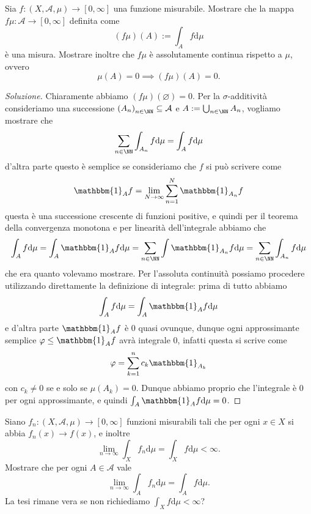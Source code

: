 \documentclass[11pt]{scrartcl}
\newcommand{\dif}{\text{d}}
\newcommand{\eset}{\varnothing}
\begin{document}
	\begin{exercise}
		Sia $f:(X,\mathcal{A},\mu)\to [0,\infty]$ una funzione misurabile. Mostrare che la mappa $f\mu:\mathcal{A}\to [0,\infty]$ definita come
		$$\left(f\mu\right)(A):=\int_A f\dif \mu$$
		è una misura. Mostrare inoltre che $f\mu$ è assolutamente continua rispetto a $\mu$, ovvero 
		$$\mu(A)=0 \implies (f\mu)(A)=0.$$
	\end{exercise}
	\begin{proof}[Soluzione]
		Chiaramente abbiamo $(f\mu)(\eset)=0$. Per la $\sigma$-additività consideriamo una successione $\left(A_n\right)_{n\in\NN}\subseteq \mathcal{A}$ e $A:=\bigcup_{n\in\NN}A_n$, vogliamo mostrare che 
		$$\sum_{n\in\NN}\int_{A_n}f\dif \mu = \int_A f\dif\mu$$
		d'altra parte questo è semplice se consideriamo che $f$ si può scrivere come
		$$\mathbbm{1}_Af=\lim_{N\to\infty}\sum_{n=1}^N\mathbbm{1}_{A_n}f$$
		questa è una successione crescente di funzioni positive, e quindi per il teorema della convergenza monotona e per linearità dell'integrale abbiamo che
		$$\int_Af\dif \mu = \int_A\mathbbm{1}_Af\dif \mu=\sum_{n\in\NN}\int \mathbbm{1}_{A_n}f\dif \mu=\sum_{n\in\NN}\int_{A_n}f\dif\mu$$
		che era quanto volevamo mostrare. Per l'assoluta continuità possiamo procedere utilizzando direttamente la definizione di integrale: prima di tutto abbiamo
		$$\int_Af\dif \mu = \int_A\mathbbm{1}_Af\dif \mu$$
		e d'altra parte $\mathbbm{1}_Af$ è $0$ quasi ovunque, dunque ogni approssimante semplice $\varphi\le \mathbbm{1}_Af$ avrà integrale $0$, infatti questa si scrive come
		$$\varphi=\sum_{k=1}^n c_k\mathbbm{1}_{A_k}$$
		con $c_k\ne 0$ se e solo se $\mu(A_k)=0$. Dunque abbiamo proprio che l'integrale è $0$ per ogni approssimante, e quindi $\int_A\mathbbm{1}_Af\dif \mu=0$.
	\end{proof}
	\begin{exercise}
		Siano $f_n:(X,\mathcal{A},\mu)\to [0,\infty]$ funzioni misurabili tali che per ogni $x\in X$ si abbia $f_n(x)\to f(x)$, e inoltre
		$$\lim_{n\to\infty}\int_Xf_n\dif \mu = \int_Xf\dif \mu<\infty.$$
		Mostrare che per ogni $A\in\mathcal{A}$ vale
		$$\lim_{n\to\infty}\int_Af_n\dif\mu=\int_Af\dif\mu.$$
		La tesi rimane vera se non richiediamo $\int_Xf\dif\mu<\infty$?
	\end{exercise}
\end{document}
